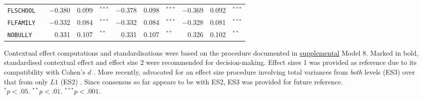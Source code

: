 {\begin{tabular}{l c rr@{\hskip -0.1mm}l rr@{\hskip -0.1mm}l rr@{\hskip -0.1mm}l}
        \texttt{FLSCHOOL} &       & $-$0.380 & 0.099 & $^{***}$   & $-$0.378 & 0.098 & $^{***}$   & $-$0.369 & 0.092 & $^{***}$ \\
        \texttt{FLFAMILY} &       & $-$0.332 & 0.084 & $^{***}$   & $-$0.332 & 0.084 & $^{***}$   & $-$0.328 & 0.081 & $^{***}$ \\
        \texttt{NOBULLY} &       & 0.331 & 0.107 & $^{**}$    & 0.331 & 0.107 & $^{**}$    & 0.326 & 0.102 & $^{**}$ \\
        \bottomrule
        \end{tabular}
}{Contextual effect computations and standardisations were based on the procedure documented in  \href{https://www.statmodel.com/download/Marsh Ludtke et al 2009 Doubly-latent Models of BFLPE  MBR full appendix .pdf}{supplemental} Model 8. Marked in bold, standardised contextual effect and effect size 2 were recommended for decision-making. Effect sizes 1 \parencite{tymms:2004} was provided as reference due to its compatibility with Cohen's $d$ \parencite{cohen:1992}. More recently, \textcite{marsh:2009} advocated for an effect size procedure involving total variances from \emph{both} levels (ES3) over that from only $L1$ (ES2) \parencite[see][p. 792]{marsh:2009}. Since consensus so far appears to be with ES2, ES3 was provided for future reference.\\
$^* p < .05$. $^{**} p < .01$. $^{***} p < .001$.}
